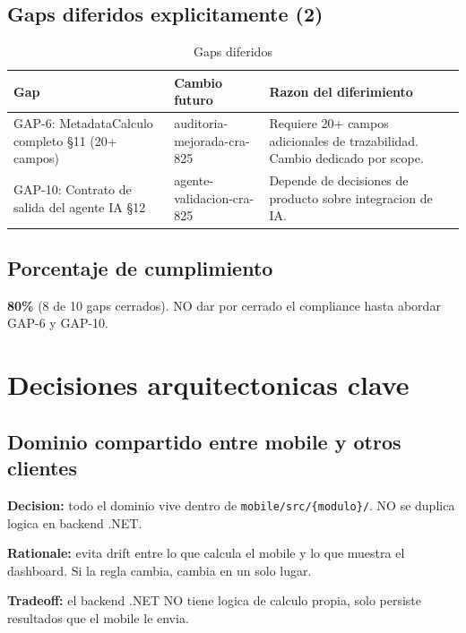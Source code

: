 \documentclass[11pt,a4paper,oneside]{report}
\begin{document}
\section{Gaps diferidos explicitamente (2)}

\begin{table}[h]
\centering
\caption{Gaps diferidos}
\begin{tabularx}{\textwidth}{L{4.5cm} L{3.5cm} X c}
\toprule
\textbf{Gap} & \textbf{Cambio futuro} & \textbf{Razon del diferimiento} \\
\midrule
GAP-6: MetadataCalculo completo §11 (20+ campos) & auditoria-mejorada-cra-825 & Requiere 20+ campos adicionales de trazabilidad. Cambio dedicado por scope. \\
GAP-10: Contrato de salida del agente IA §12 & agente-validacion-cra-825 & Depende de decisiones de producto sobre integracion de IA. \\
\bottomrule
\end{tabularx}
\end{table}

\section{Porcentaje de cumplimiento}

\textbf{80\%} (8 de 10 gaps cerrados). NO dar por cerrado el compliance hasta abordar GAP-6 y GAP-10.


\chapter{Decisiones arquitectonicas clave}

\section{Dominio compartido entre mobile y otros clientes}

\textbf{Decision:} todo el dominio vive dentro de \texttt{mobile/src/\{modulo\}/}. NO se duplica logica en backend .NET.

\textbf{Rationale:} evita drift entre lo que calcula el mobile y lo que muestra el dashboard. Si la regla cambia, cambia en un solo lugar.

\textbf{Tradeoff:} el backend .NET NO tiene logica de calculo propia, solo persiste resultados que el mobile le envia.
\end{document}
